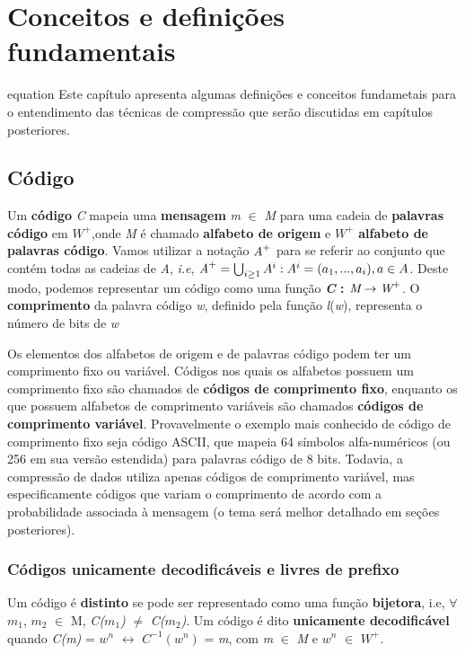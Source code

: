 \chapter{Conceitos e definições fundamentais}equation
Este capítulo apresenta algumas definições e conceitos fundametais para o entendimento das técnicas de compressão que serão discutidas em capítulos posteriores.

\section{Código}

Um \textbf{código} \emph{C} mapeia uma \textbf{mensagem} \emph{m} $\in$ \emph{M} para uma cadeia de \textbf{palavras código} em \emph{$W^+$},onde \emph{M} é chamado \textbf{alfabeto de origem} e \emph{$W^+$} \textbf{alfabeto de palavras código}. Vamos utilizar a notação $\emph{A}^+$ para se referir ao conjunto que contém todas as cadeias de \emph{A}, \emph{i.e}, $\emph{A}^+ = \bigcup_{i \geq 1}^{}A^{i} : A^i = (a_1,...,a_i), a \in A $. Deste modo, podemos representar um código como uma função \textbf{\emph{C} : $\emph{M} \rightarrow \emph{W}^+$}.  O \textbf{comprimento} da palavra código \emph{w}, definido pela função \emph{l}(\emph{w}), representa o número de bits de \emph{w}

Os elementos dos alfabetos de origem e de palavras código podem ter um comprimento fixo ou variável. Códigos nos quais os alfabetos possuem um comprimento fixo são chamados de \textbf{códigos de comprimento fixo}, enquanto os que possuem alfabetos de comprimento variáveis são chamados \textbf{códigos de comprimento variável}. Provavelmente o exemplo mais conhecido de código de comprimento fixo seja código ASCII, que mapeia 64 símbolos alfa-numéricos (ou 256 em sua versão estendida) para palavras código de 8 bits. Todavia, a compressão de dados utiliza apenas códigos de comprimento variável, mas especificamente códigos que variam o comprimento de acordo com a probabilidade associada à mensagem (o tema será melhor detalhado em seções posteriores). 

\subsection{Códigos unicamente decodificáveis e livres de prefixo}
Um código é \textbf{distinto} se pode ser representado como uma função \textbf{bijetora}, i.e, $\forall$ $m_1$, $m_2$ $\in$ M, \emph{C($m_1$)} $\neq$ \emph{C($m_2$)}. Um código é dito \textbf{unicamente decodificável} quando \emph{C(m)} = $w^n$ $\leftrightarrow$ \emph{$C^{-1}(w^n)$} = \emph{m}, com \emph{m} $\in$ \emph{M} e \emph{$w^n$} $\in$ $W^+$.

